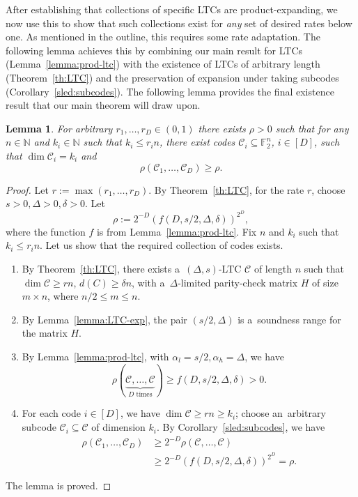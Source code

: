 \documentclass[conference]{IEEEtran}
\let\le\leqslant
\let\ge\geqslant
\theoremstyle{plain}
\newtheorem{lemma}[theorem]{Lemma}
\theoremstyle{definition}
\theoremstyle{remark}
\newcommand{\NN}{\mathbb{N}}
\newcommand{\cC}{\mathcal{C}}
\newcommand{\F}{\mathbb{F}}
\begin{document}
After establishing that collections of specific LTCs are product-expanding, we now use this to show that such collections exist for \emph{any} set of desired rates below one. As mentioned in the outline, this requires some rate adaptation. The following lemma achieves this by combining our main result for LTCs (Lemma~\ref{lemma:prod-ltc}) with the existence of LTCs of arbitrary length (Theorem~\ref{th:LTC}) and the preservation of expansion under taking subcodes (Corollary~\ref{sled:subcodes}). The following lemma provides the final existence result that our main theorem will draw upon.

\begin{lemma}\label{lemma:prodexp-exists}
    For arbitrary $r_1,\dots,r_D\in (0,1)$ there exists $\rho>0$ such that for any $n\in \NN$ and $k_i\in\NN$ such that $k_i\le r_i n$, there exist codes $\cC_i\subseteq\F_2^n$, $i\in [D]$, such that $\dim \cC_i=k_i$ and 
    \[\rho(\cC_1,\dots,\cC_D)\ge \rho.\]
\end{lemma}

\begin{proof}
    Let $r:=\max(r_1,\dots,r_D)$. By Theorem~\ref{th:LTC}, for the rate $r$, choose $s>0,\Delta>0,\delta>0$. Let \[
    \rho:=2^{-D}(f(D, s/2,\Delta, \delta))^{2^D},
    \] where the function $f$ is from Lemma~\ref{lemma:prod-ltc}. Fix $n$ and $k_i$ such that $k_i\le r_in$. 
    Let us show that the required collection of codes exists.
    \begin{enumerate}
        \item By Theorem~\ref{th:LTC}, there exists a~$(\Delta,s)$-LTC $\cC$ of length $n$ such that $\dim \cC\ge rn$, $d(C)\ge\delta n$, with a~$\Delta$-limited parity-check matrix $H$ of size $m\times n$, where $n/2\le m\le n$.
        \item By Lemma~\ref{lemma:LTC-exp}, the pair $(s/2,\Delta)$ is a~soundness range for the matrix $H$.
        \item By Lemma~\ref{lemma:prod-ltc}, with $\alpha_l=s/2,\alpha_h=\Delta$, we have 
        \[\rho(\underbrace{\cC,\dots,\cC}_{D\text{ times}})\ge f(D,s/2,\Delta,\delta)>0.\]
        \item For each code $i\in [D]$, we have $\dim \cC\ge rn\ge k_i$; choose an~arbitrary subcode $\cC_i\subseteq \cC$ of dimension $k_i$. By Corollary~\ref{sled:subcodes}, we have
        \begin{align*}
        \rho(\cC_1,\dots,\cC_D)&\ge 2^{-D}\rho(\cC,\dots,\cC)\\
        &\ge 2^{-D}(f(D, s/2,\Delta, \delta))^{2^D}=\rho.
        \end{align*}
    \end{enumerate}
    The lemma is proved.
\end{proof}
\end{document}
